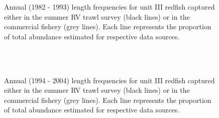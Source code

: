 \documentclass[11pt]{article}
\newcommand{\D}{.}
\newcommand{\e}{/home/ecomod_data/redfish/figures/}
\begin{document}
\begin{landscape}
\begin{figure}
\caption{Annual (1982 - 1993) length frequencies for unit III redfish captured either in the summer RV trawl survey (black lines) or in the commercial fishery (grey lines). Each line represents the proportion of total abundance estimated for respective data sources.}
\end{figure}
\clearpage

\begin{figure}
\centering
{}
\\
\\
\caption{Annual (1994 - 2004) length frequencies for unit III redfish captured either in the summer RV trawl survey (black lines) or in the commercial fishery (grey lines). Each line represents the proportion of total abundance estimated for respective data sources.}

\end{figure}
\clearpage


\end{landscape}
\end{document}
